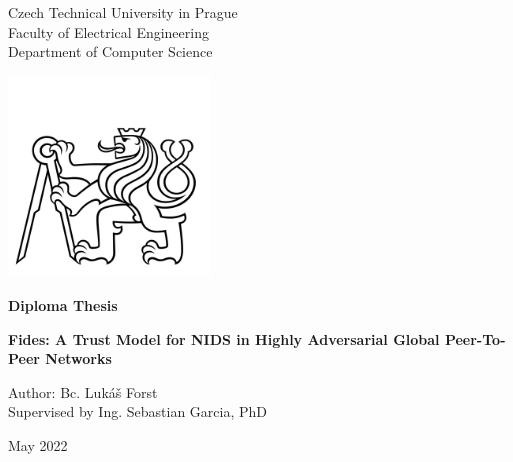 

\begin{titlepage}
    \begin{center}
        
        \LARGE
        Czech Technical University in Prague\\
        Faculty of Electrical Engineering\\
        Department of Computer Science
        
        \includegraphics[width=0.4\textwidth]{assets/ctu_blackwhite.jpg}

        \Large
        \textbf{Diploma Thesis}
        
        \vfill
        
        \vspace*{0.5cm}
        \LARGE
        \textbf{Fides: A Trust Model for NIDS in Highly Adversarial Global Peer-To-Peer Networks}
        

        \vfill

        \large
        Author: Bc. Lukáš Forst \\
        Supervised by Ing. Sebastian Garcia, PhD
        
        \vspace{0.8cm}

        \Large
        May 2022

    \end{center}
\end{titlepage}

\thispagestyle{empty}
\cleardoublepage